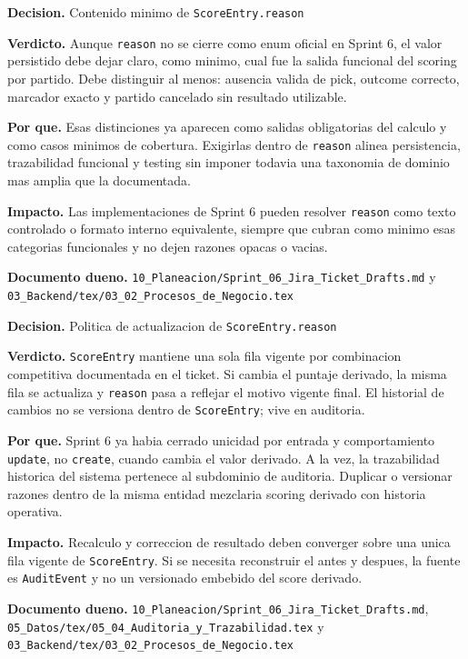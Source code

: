 \begin{docnote}
\textbf{Decision.} Contenido minimo de \texttt{ScoreEntry.reason}

\textbf{Verdicto.} Aunque \texttt{reason} no se cierre como enum oficial en Sprint 6, el valor persistido debe dejar claro, como minimo, cual fue la salida funcional del scoring por partido. Debe distinguir al menos: ausencia valida de pick, outcome correcto, marcador exacto y partido cancelado sin resultado utilizable.

\textbf{Por que.} Esas distinciones ya aparecen como salidas obligatorias del calculo y como casos minimos de cobertura. Exigirlas dentro de \texttt{reason} alinea persistencia, trazabilidad funcional y testing sin imponer todavia una taxonomia de dominio mas amplia que la documentada.

\textbf{Impacto.} Las implementaciones de Sprint 6 pueden resolver \texttt{reason} como texto controlado o formato interno equivalente, siempre que cubran como minimo esas categorias funcionales y no dejen razones opacas o vacias.

\textbf{Documento dueno.} \texttt{10\_Planeacion/Sprint\_06\_Jira\_Ticket\_Drafts.md} y \texttt{03\_Backend/tex/03\_02\_Procesos\_de\_Negocio.tex}
\end{docnote}

\begin{docnote}
\textbf{Decision.} Politica de actualizacion de \texttt{ScoreEntry.reason}

\textbf{Verdicto.} \texttt{ScoreEntry} mantiene una sola fila vigente por combinacion competitiva documentada en el ticket. Si cambia el puntaje derivado, la misma fila se actualiza y \texttt{reason} pasa a reflejar el motivo vigente final. El historial de cambios no se versiona dentro de \texttt{ScoreEntry}; vive en auditoria.

\textbf{Por que.} Sprint 6 ya habia cerrado unicidad por entrada y comportamiento \texttt{update}, no \texttt{create}, cuando cambia el valor derivado. A la vez, la trazabilidad historica del sistema pertenece al subdominio de auditoria. Duplicar o versionar razones dentro de la misma entidad mezclaria scoring derivado con historia operativa.

\textbf{Impacto.} Recalculo y correccion de resultado deben converger sobre una unica fila vigente de \texttt{ScoreEntry}. Si se necesita reconstruir el antes y despues, la fuente es \texttt{AuditEvent} y no un versionado embebido del score derivado.

\textbf{Documento dueno.} \texttt{10\_Planeacion/Sprint\_06\_Jira\_Ticket\_Drafts.md}, \texttt{05\_Datos/tex/05\_04\_Auditoria\_y\_Trazabilidad.tex} y \texttt{03\_Backend/tex/03\_02\_Procesos\_de\_Negocio.tex}
\end{docnote}

